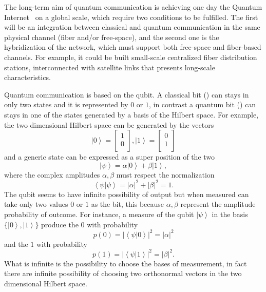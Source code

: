 The long-term aim of quantum communication is achieving one day the Quantum Internet~\cite{a19} on a global scale, which require two conditions to be fulfilled. The first will be an integration between classical and quantum communication in the same physical channel (fiber and/or free-space), and the second one is the hybridization of the network, which must support both free-space and fiber-based channels. For example, it could be built small-scale centralized fiber distribution stations, interconnected with satellite links that presents long-scale characteristics.


Quantum communication is based on the qubit. A classical bit () can stays in only two states and it is represented by $0$ or $1$, in contrast a quantum bit () can stays in one of the states generated by  a basis of the Hilbert space.
For example, the two dimensional Hilbert space can be generated by the vectors
\begin{equation}
  \left|0\right> = \begin{bmatrix} 1 \\ 0 \\ \end{bmatrix}, \left|1\right> = \begin{bmatrix} 0 \\ 1 \\ \end{bmatrix}
\end{equation}
and a generic state can be expressed as a super position of the two
\begin{equation}
  \left|\psi\right> = \alpha\left|0\right> + \beta\left|1\right>,
\end{equation}
where the complex amplitudes $\alpha, \beta$ must respect the normalization
\begin{equation}
  \left<\psi|\psi\right> = |\alpha|^2 + |\beta|^2 = 1.
\end{equation}
The qubit seems to have infinite possibility of output but when measured can take only two values $0$ or $1$ as the bit, this because $\alpha, \beta$ represent the amplitude probability of outcome. For instance, a measure of the qubit $\left|\psi\right>$ in the basis $\{\left|0\right>, \left|1\right>\}$ produce the $0$ with probability
\begin{equation}
  p(0) = |\left<\psi|0\right>|^2 = |\alpha|^2
\end{equation}
and the $1$ with probability
\begin{equation}
  p(1) = |\left<\psi|1\right>|^2 = |\beta|^2.
\end{equation}
What is infinite is the possibility to choose the bases of measurement, in fact there are infinite possibility of choosing two orthonormal vectors in the two dimensional Hilbert space.

